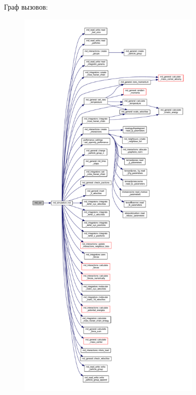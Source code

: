 Граф вызовов\+:\nopagebreak
\begin{figure}[H]
\begin{center}
\leavevmode
\includegraphics[height=550pt]{run__md__simulation_8f90_a046456b29e3157bccd7d9d4e3c5f6b43_cgraph}
\end{center}
\end{figure}
